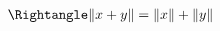 \documentclass[preview]{standalone}
\begin{document}
\begin{align*}
\Rightangle \lVert x + y \rVert  = \lVert x \rVert + \lVert  y \rVert
\end{align*}
\end{document}
